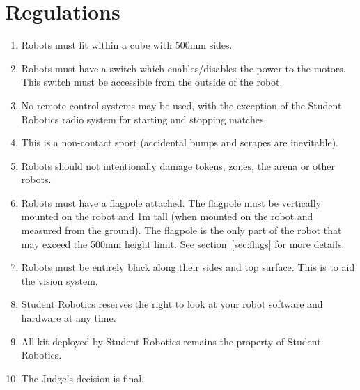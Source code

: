 \section {Regulations}
\label{regs}

\begin{enumerate}
\item Robots must fit within a cube with 500mm sides.
\item Robots must have a switch which enables/disables the power to the motors.  This switch must be accessible from the outside of the robot.
\item No remote control systems may be used, with the exception of the Student Robotics radio system for starting and stopping matches.
\item This is a non-contact sport (accidental bumps and scrapes are inevitable).
\item Robots should not intentionally damage tokens, zones, the arena or other robots.

\item Robots must have a flagpole attached.  The flagpole must be vertically mounted on the robot and 1m tall (when mounted on the robot and measured from the ground).  The flagpole is the only part of the robot that may exceed the 500mm height limit.  See section~\ref{sec:flags} for more details.

\item Robots must be entirely black along their sides and top surface.  This is to aid the vision system.

\item Student Robotics reserves the right to look at your robot software and hardware at any time.
\item All kit deployed by Student Robotics remains the property of Student Robotics.
\item The Judge's decision is final.
\end{enumerate}
